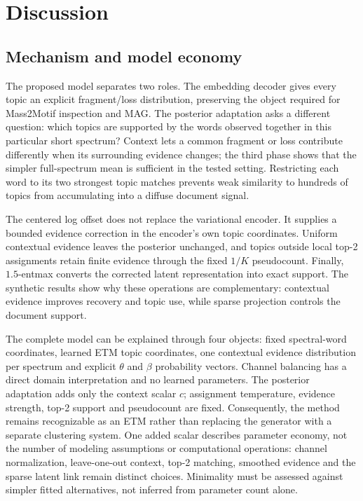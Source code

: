 \documentclass[10pt,a4paper]{article}
\begin{document}
\section{Discussion}

\subsection{Mechanism and model economy}

The proposed model separates two roles. The embedding decoder gives every topic an
explicit fragment/loss distribution, preserving the object required for
Mass2Motif inspection and MAG. The posterior adaptation asks a different
question: which topics are supported by the words observed together in this
particular short spectrum? Context lets a common fragment or loss contribute
differently when its surrounding evidence changes; the third phase shows that
the simpler full-spectrum mean is sufficient in the tested setting. Restricting each
word to its two strongest topic matches prevents weak similarity to hundreds of
topics from accumulating into a diffuse document signal.

The centered log offset does not replace the variational encoder. It supplies a
bounded evidence correction in the encoder's own topic coordinates. Uniform
contextual evidence leaves the posterior unchanged, and topics outside local
top-2 assignments
retain finite evidence through the fixed $1/K$ pseudocount. Finally,
$1.5$-entmax converts the corrected latent representation into exact support.
The synthetic results show why these operations are complementary: contextual
evidence improves recovery and topic use, while sparse projection controls the
document support.

The complete model can be explained through four objects: fixed spectral-word
coordinates, learned ETM topic coordinates, one contextual evidence
distribution per spectrum and explicit $\theta$ and $\beta$ probability
vectors. Channel balancing has a direct domain interpretation and no learned
parameters. The posterior adaptation adds only the context scalar $c$;
assignment temperature, evidence strength, top-2 support and pseudocount are
fixed.
Consequently, the method remains recognizable as an ETM rather than replacing
the generator with a separate clustering system.
One added scalar describes parameter economy, not the number of modeling
assumptions or computational operations: channel normalization, leave-one-out
context, top-2 matching, smoothed evidence and the sparse latent link remain
distinct choices. Minimality must be assessed against simpler fitted
alternatives, not inferred from parameter count alone.
\end{document}
